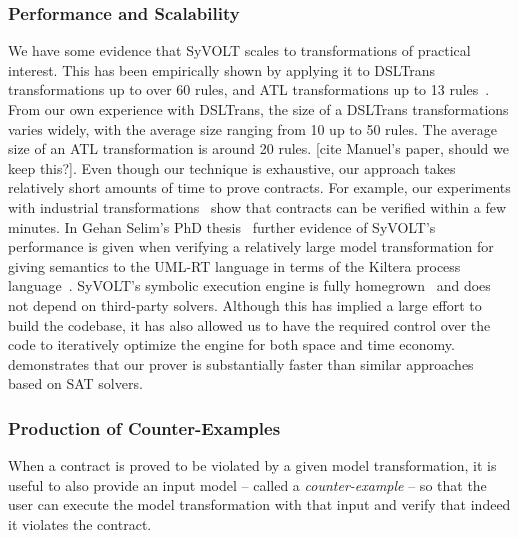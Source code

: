 \subsubsection{Performance and Scalability}

We have some evidence that SyVOLT scales to transformations of practical
interest. This has been empirically shown by applying it to DSLTrans
transformations up to over 60 rules, and ATL transformations up to 13
rules~\cite{Oakes}. From our own experience with DSLTrans, the size of a
DSLTrans transformations varies widely, with the average size ranging from 10 up
to 50 rules. The average size of an ATL transformation is around 20 rules. [cite
Manuel's paper, should we keep this?]. Even though our technique is exhaustive, our
approach takes relatively short amounts of time to prove contracts. For example,
our experiments with industrial transformations~\cite{Oakes} show that contracts
can be verified within a few minutes. In Gehan Selim's PhD
thesis~\cite{Selim2015} further evidence of SyVOLT's performance is given when
verifying a relatively large model transformation for giving semantics to the
UML-RT language in terms of the Kiltera process language~\cite{PosseDingel2014}.
SyVOLT's symbolic execution engine is fully
homegrown~\cite{LucioVang} and does not depend on third-party solvers. Although this has implied
a large effort to build the codebase, it has also allowed us to have the
required control over the code to iteratively optimize the engine for both space
and time economy.
\cite{Selim2014} demonstrates that our prover is substantially faster than
similar approaches based on SAT solvers.


\subsubsection{Production of Counter-Examples}

When a contract is proved to be violated by a given model transformation, it is
useful to also provide an input model -- called a \emph{counter-example} -- so
that the user can execute the model transformation with that input and verify
that indeed it violates the contract.

